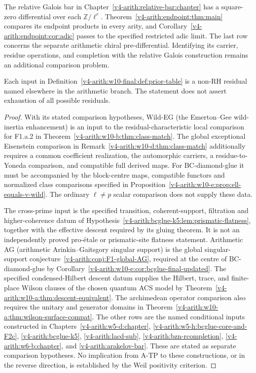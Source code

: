 The relative Galois bar in Chapter~\ref{v4-arith:relative-bar:chapter}
has a square-zero differential over each $\mathbb Z/\ell^r$.
Theorem~\ref{v4-arith:endpoint:thm:main} compares its endpoint products
in every arity, and Corollary~\ref{v4-arith:endpoint:cor:adic} passes
to the specified restricted adic limit. The last row concerns the
separate arithmetic chiral pre-differential. Identifying its carrier,
residue operations, and completion with the relative Galois construction
remains an additional comparison problem.

\begin{theorem}
\label{v4-arith:w10-final:thm:four-prior}
\ClaimStatusProvedHere Each input in
Definition~\ref{v4-arith:w10-final:def:prior-table} is a non-RH residual named
elsewhere in the arithmetic branch. The statement does not assert
exhaustion of all possible residuals.
\end{theorem}

\begin{proof}
With its stated comparison hypotheses, Wild-EG (the Emerton--Gee
wild-inertia enhancement) is an input to the residual-characteristic
local comparison for F1.a.2 in Theorem~\ref{v4-arith:w10-b:thm:class-match}.
The global exceptional Eisenstein comparison in
Remark~\ref{v4-arith:w10-d:thm:class-match} additionally requires a common
coefficient realization, the automorphic carriers, a residue-to-Yoneda
comparison, and compatible full derived maps.
For BC-diamond-glue it must be accompanied
by the block-centre maps, compatible
functors and normalized class comparisons
specified in
Proposition~\ref{v4-arith:w10-e:prop:ell-equals-v-wild}.
The ordinary \(\ell\neq p\) scalar comparison
does not supply these data.

The cross-prime input is the specified transition, coherent-support,
filtration and higher-coherence datum of
Hypothesis~\ref{v4-arith:bcglue-k5:lem:prismatic-flatness}, together
with the effective descent required by its gluing theorem. It is
not an independently proved pro-\'etale or prismatic-site flatness
statement. Arithmetic AG (arithmetic
Arinkin--Gaitsgory singular support) is the global singular-support
conjecture~\ref{v4-arith:conj:F1-global-AG}, required at the centre
of BC-diamond-glue by Corollary~\ref{v4-arith:w10-e:cor:bcglue-final-updated}.
The specified condensed-Hilbert descent datum supplies the Hilbert,
trace, and finite-place Wilson clauses of the chosen quantum ACS model
by Theorem~\ref{v4-arith:w10-a:thm:descent-equivalent}. The archimedean
operator comparison also requires the unitary and generator domains in
Theorem~\ref{v4-arith:w10-a:thm:wilson-surface-compat}.
The other rows are the named conditional inputs constructed in
Chapters~\ref{v4-arith:w5-d:chapter},
\ref{v4-arith:w5-h:bcglue-core-and-F2c},
\ref{v4-arith:bcglue-k5},
\ref{v4-arith:lacd-sub}, \ref{v4-arith:bzn-rcompletion},
\ref{v4-arith:w6-b:chapter}, and
\ref{v4-arith:arakelov-bar}.  These are stated as separate comparison hypotheses. No implication
from A-TP to these constructions, or in the reverse direction, is
established by the Weil positivity criterion.
\end{proof}

